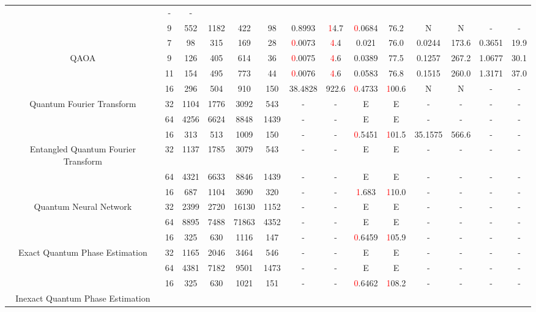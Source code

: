 \begin{table}[htb]
{\begin{tabular}{|c|c|c|c|c|c|c|c|c|c|c|c|c|c|}
 & - & -
 \\
 & 
9 & 552 & 1182 & 422 & 98
 & 0.8993 & \textcolor{red}14.7
 & \textcolor{red}0.0684 & 76.2
 & N & N 
 & - & -
 \\
\hline
 & 
7 & 98 & 315 & 169 & 28
 & \textcolor{red}0.0073 & \textcolor{red}4.4
 & 0.021 & 76.0
 & 0.0244 & 173.6
 & 0.3651 & 19.9
 \\
QAOA & 
9 & 126 & 405 & 614 & 36
 & \textcolor{red}0.0075 & \textcolor{red}4.6
 & 0.0389 & 77.5
 & 0.1257 & 267.2
 & 1.0677 & 30.1
 \\
 & 
11 & 154 & 495 & 773 & 44
 & \textcolor{red}0.0076 & \textcolor{red}4.6
 & 0.0583 & 76.8
 & 0.1515 & 260.0
 & 1.3171 & 37.0
 \\
\hline
 & 
16 & 296 & 504 & 910 & 150
 & 38.4828 & 922.6
 & \textcolor{red}0.4733 & \textcolor{red}100.6
 & N & N 
 & - & -
 \\
Quantum Fourier Transform & 
32 & 1104 & 1776 & 3092 & 543
 & - & -
 & E & E
 & - & -
 & - & -
 \\
 & 
64 & 4256 & 6624 & 8848 & 1439
 & - & -
 & E & E
 & - & -
 & - & -
 \\
\hline
 & 
16 & 313 & 513 & 1009 & 150
 & - & -
 & \textcolor{red}0.5451 & \textcolor{red}101.5
 & 35.1575 & 566.6
 & - & -
 \\
Entangled Quantum Fourier Transform & 
32 & 1137 & 1785 & 3079 & 543
 & - & -
 & E & E
 & - & -
 & - & -
 \\
 & 
64 & 4321 & 6633 & 8846 & 1439
 & - & -
 & E & E
 & - & -
 & - & -
 \\
\hline
 & 
16 & 687 & 1104 & 3690 & 320
 & - & -
 & \textcolor{red}1.683 & \textcolor{red}110.0
 & - & -
 & - & -
 \\
Quantum Neural Network & 
32 & 2399 & 2720 & 16130 & 1152
 & - & -
 & E & E
 & - & -
 & - & -
 \\
 & 
64 & 8895 & 7488 & 71863 & 4352
 & - & -
 & E & E
 & - & -
 & - & -
 \\
\hline
 & 
16 & 325 & 630 & 1116 & 147
 & - & -
 & \textcolor{red}0.6459 & \textcolor{red}105.9
 & - & -
 & - & -
 \\
Exact Quantum Phase Estimation & 
32 & 1165 & 2046 & 3464 & 546
 & - & -
 & E & E
 & - & -
 & - & -
 \\
 & 
64 & 4381 & 7182 & 9501 & 1473
 & - & -
 & E & E
 & - & -
 & - & -
 \\
\hline
 & 
16 & 325 & 630 & 1021 & 151
 & - & -
 & \textcolor{red}0.6462 & \textcolor{red}108.2
 & - & -
 & - & -
 \\
Inexact Quantum Phase Estimation & 

\end{tabular}}
\end{table}
